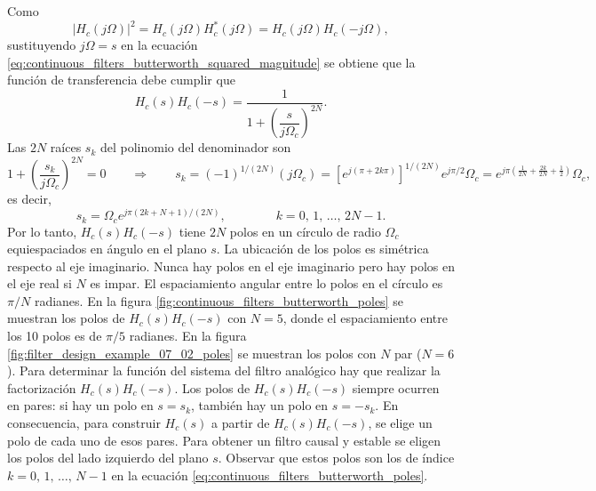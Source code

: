 \documentclass[a4paper]{report}
\begin{document}
Como
\[
 |H_c(j\Omega)|^2=H_c(j\Omega)H^*_c(j\Omega)=H_c(j\Omega)H_c(-j\Omega),
\]
sustituyendo \(j\Omega=s\) en la ecuación \ref{eq:continuous_filters_butterworth_squared_magnitude} se obtiene que la función de transferencia debe cumplir que 
\[
 H_c(s)H_c(-s)=\frac{1}{1+\left(\dfrac{s}{j\Omega_c}\right)^{2N}}.
\]
Las \(2N\) raíces \(s_k\) del polinomio del denominador son
\[
 1+\left(\dfrac{s_k}{j\Omega_c}\right)^{2N}=0
 \qquad\Rightarrow\qquad 
 s_k=(-1)^{1/(2N)}(j\Omega_c)=\left[e^{j(\pi+2k\pi)}\right]^{1/(2N)}e^{j\pi/2}\Omega_c
 =e^{j\pi\left(\frac{1}{2N}+\frac{2k}{2N}+\frac{1}{2}\right)}\Omega_c,
\]
es decir,
\begin{equation}\label{eq:continuous_filters_butterworth_poles}
 s_k=\Omega_ce^{j\pi\left(2k+N+1\right)/(2N)},
 \qquad\qquad 
 k=0,\,1,\,\dots,\,2N-1.
\end{equation}
Por lo tanto, \(H_c(s)H_c(-s)\) tiene \(2N\) polos en un círculo de radio \(\Omega_c\) equiespaciados en ángulo en el plano \(s\). La ubicación de los polos es simétrica respecto al eje imaginario. Nunca hay polos en el eje imaginario pero hay polos en el eje real si \(N\) es impar. El espaciamiento angular entre lo polos en el círculo es \(\pi/N\) radianes. En la figura \ref{fig:continuous_filters_butterworth_poles} se muestran los polos de \(H_c(s)H_c(-s)\) con \(N=5\), donde el espaciamiento entre los 10 polos es de \(\pi/5\) radianes. En la figura \ref{fig:filter_design_example_07_02_poles} se muestran los polos con \(N\) par (\(N=6\)).
Para determinar la función del sistema del filtro analógico hay que realizar la factorización \(H_c(s)H_c(-s)\). Los polos de \(H_c(s)H_c(-s)\) siempre ocurren en pares: si hay un polo en \(s=s_k\), también hay un polo en \(s=-s_k\). En consecuencia, para construir \(H_c(s)\) a partir de \(H_c(s)H_c(-s)\), se elige un polo de cada uno de esos pares. Para obtener un filtro causal y estable se eligen los polos del lado izquierdo del plano \(s\). Observar que estos polos son los de índice \(k=0,\,1,\,\dots,\,N-1\) en la ecuación \ref{eq:continuous_filters_butterworth_poles}.
\end{document}
